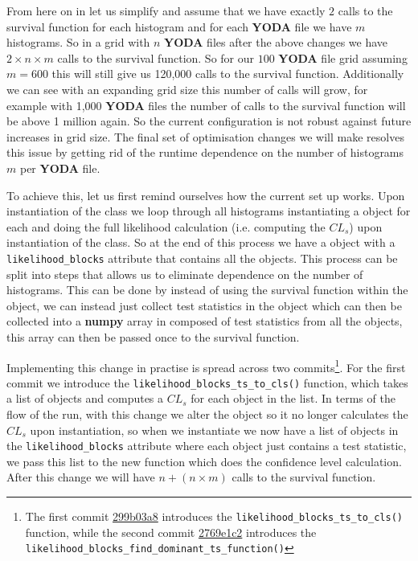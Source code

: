 From here on in let us simplify and assume that we have exactly $2$ calls to the survival function for each histogram and for each \textbf{YODA} file we have $m$ histograms. So in a grid with $n$ \textbf{YODA} files after the above changes we have $2\times n\times m$ calls to the survival function. So for our $100$ \textbf{YODA} file grid assuming $m=600$ this will still give us 120,000 calls to the survival function. Additionally we can see with an expanding grid size this number of calls will grow, for example with 1,000 \textbf{YODA} files the number of calls to the survival function will be above 1 million again. So the current configuration is not robust against future increases in grid size. The final set of optimisation changes we will make resolves this issue by getting rid of the runtime dependence on the number of histograms $m$ per \textbf{YODA} file.

To achieve this, let us first remind ourselves how the current set up works. Upon instantiation of the  class we loop through all histograms instantiating a  object for each and doing the full likelihood calculation (i.e. computing the $CL_s$) upon instantiation of the  class. So at the end of this process we have a  object with a \texttt{likelihood\_blocks} attribute that contains all the  objects. This process can be split into steps that allows us to eliminate dependence on the number of histograms. This can be done by instead of using the survival function within the  object, we can instead just collect test statistics in the  object which can then be collected into a \textbf{numpy} array in  composed of test statistics from all the   objects, this array can then be passed once to the survival function.

Implementing this change in practise is spread across two commits\footnote{The first commit \href{https://gitlab.com/hepcedar/contur/-/commit/299b03a86812b47e30ed66d4f82a59a3584cf523}{299b03a8} introduces the \texttt{likelihood\_blocks\_ts\_to\_cls()} function, while the second commit \href{https://gitlab.com/hepcedar/contur/-/commit/2769e1c2a020efd2de2919db2413309eef8a8e64}{2769e1c2} introduces the \texttt{likelihood\_blocks\_find\_dominant\_ts\_function()}}. For the first commit we introduce the \texttt{likelihood\_blocks\_ts\_to\_cls()} function, which takes a list of  objects and computes a $CL_s$ for each  object in the list. In terms of the flow of the run, with this change we alter the  object so it no longer calculates the $CL_s$ upon instantiation, so when we instantiate  we now have a list of  objects in the \texttt{likelihood\_blocks} attribute where each  object just contains a test statistic, we pass this list to the new function which does the confidence level calculation. After this change we will have $n + (n\times m)$ calls to the survival function.

